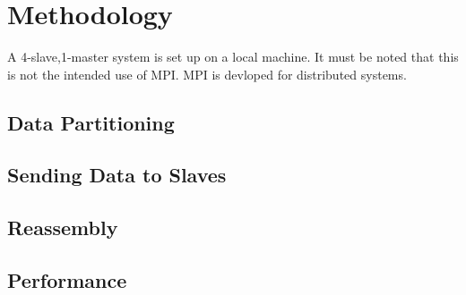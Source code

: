 \section{Methodology}
A 4-slave,1-master system is set up on a local machine. It must be noted that this is not the intended use of MPI. MPI is devloped for distributed systems.
\subsection{Data Partitioning}
\subsection{Sending Data to Slaves}
\subsection{Reassembly}
\subsection{Performance}